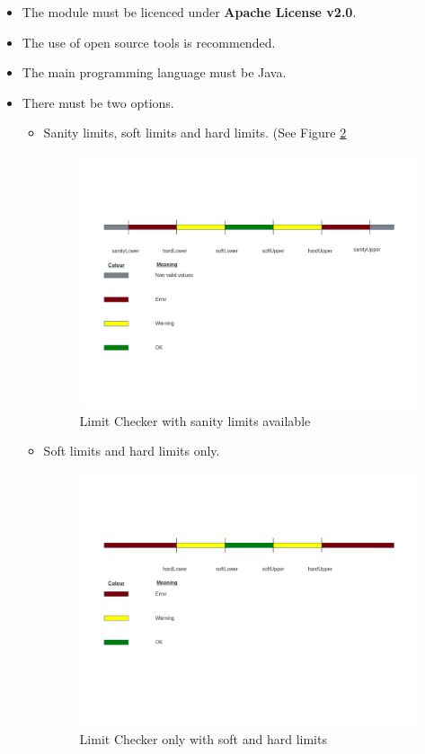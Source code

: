 \begin{itemize}
\item The module must be licenced under \textbf{Apache License v2.0}\cite{AL20}.
\item The use of open source tools is recommended.
\item The main programming language must be Java\cite{Java}.
\item There must be two options.
\begin{itemize}
\item Sanity limits, soft limits and hard limits. (See Figure \ref{f4.1}
\begin{figure}[H]
\centerline{\includegraphics[width=1\textwidth]{images/LimitChecking1.png}}
\caption{Limit Checker with sanity limits available}
\label{f4.1}
\end{figure}
\item Soft limits and hard limits only.
\begin{figure}[H]
\centerline{\includegraphics[width=1\textwidth]{images/LimitChecking2.png}}
\caption{Limit Checker only with soft and hard limits}
\label{f4.1}
\end{figure}
\end{itemize}

\end{itemize}

